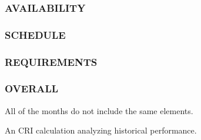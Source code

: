 \documentclass[SDSUThesis.tex]{subfiles}
\begin{document}
            
            
            
        \subsubsection{AVAILABILITY}
        \subsubsection{SCHEDULE}
        \subsubsection{REQUIREMENTS}
        \subsubsection{OVERALL}
            All of the months do not include the same elements.  
    
    An CRI calculation analyzing historical performance.


\end{document}
